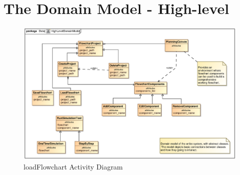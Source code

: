 \documentclass[11pt,a4paper,titlepage]{article}
\begin{document}
\section{The Domain Model - High-level}
\begin{figure}[H]
  \centering
\includegraphics[width=500px]{HighLevelDomainModel.eps}
\caption{loadFlowchart Activity Diagram}
\end{figure}
\end{document}

